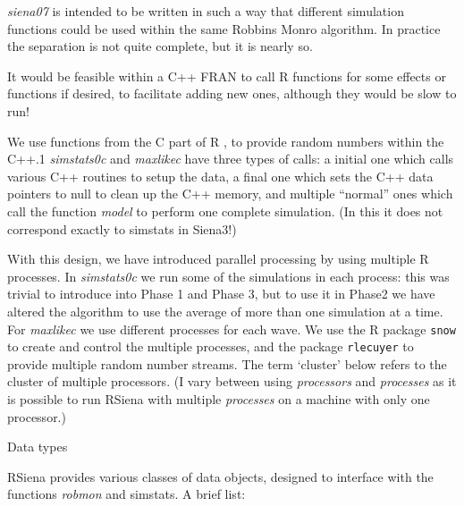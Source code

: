 \documentclass[12pt,a4paper]{article}
\makeatletter
\renewcommand{\=}{\,=\,}
\newcommand{\+}{\,+\,}
\newcommand{\nm}[1]{\textsf{ #1}}
\newcommand{\nnm}[1]{\textsf{\textit{#1}}}
\renewcommand{\section}{\@startsection{section}{1}
                {0pt}{\baselineskip}{0.5\baselineskip}
                {\centering\sffamily} }
\newcommand{\R}{{\sf R }}
\newcommand{\RS}{{\sf RSiena }}
\makeatother
\begin{document}
\nnm{siena07} is intended to be written in such a way that different simulation
functions could be used within the same Robbins Monro algorithm. In practice the
separation is not quite complete, but it is nearly so.

It would be feasible within a C++ \nm{FRAN} to call \R functions for some
effects or functions if desired, to facilitate adding new ones, although they
would be slow to run!

We use functions from the C part of \R, to provide random numbers within the
C++.1 \nnm{simstats0c} and \nnm{maxlikec} have three types of calls: a initial
one which calls various C++ routines to setup the data, a final one which sets
the C++ data pointers to null to clean up the C++ memory, and multiple
``normal'' ones which call the function \nnm{model} to perform one complete
simulation. (In this it does not correspond exactly to \nm{simstats} in Siena3!)

With this design, we have introduced parallel processing by using multiple \R
processes. In \nnm{simstats0c} we run some of the simulations in each process:
this was trivial to introduce into Phase 1 and Phase 3, but to use it in Phase2
we have altered the algorithm to use the average of more than one simulation at
a time. For \nnm{maxlikec} we use different processes for each wave.  We use the
\R package \verb|snow| to create and control the multiple processes, and the
package \verb|rlecuyer| to provide multiple random number streams.  The term
`cluster' below refers to the cluster of multiple processors. (I vary between
using \emph{processors} and \emph{processes} as it is possible to run \RS with
multiple \emph{processes} on a machine with only one processor.)


\section{Data types}

\RS provides various classes of data objects, designed to interface with the
functions \nnm{robmon} and \nm{simstats}. A brief list:
\end{document}
